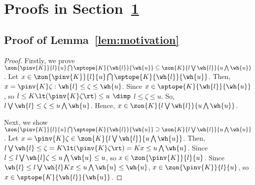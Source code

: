 
\section{Proofs in Section~\ref{}}
%
\subsection*{Proof of Lemma~\ref{lem:motivation}}
\begin{proof}
Firstly, we prove $\zon{\pinv{K}}{l}{u} \bigcap
\sptope{K}{\wh{l}}{\wh{u}} \subseteq \zon{K}{l\bigvee
  \wh{l}}{u\bigwedge \wh{u}}$.  Let $x\in\zon{\pinv{K}}{l}{u} \bigcap
\sptope{K}{\wh{l}}{\wh{u}}$.  Then, $x=\pinv{K}\zeta:
\wh{l}\leq\zeta\leq \wh{u}$.  Since $x\in\sptope{K}{\wh{l}}{\wh{u}}$, so
$l\leq K\lt(\pinv{K}\zeta\rt)\leq u$ $\dimp$ $l\leq \zeta\leq u$.  So,
$l\bigvee \wh{l}\leq \zeta\leq u\bigwedge\wh{u}$.  Hence, $x\in\zon{K}{l\bigvee
  \wh{l}}{u\bigwedge \wh{u}}$.

Next, we show $\zon{\pinv{K}}{l}{u} \bigcap \sptope{K}{\wh{l}}{\wh{u}}
\supseteq \zon{K}{l\bigvee \wh{l}}{u\bigwedge \wh{u}}$. Let
$x=\pinv{K}\zeta\in\zon{K}{l\bigvee \wh{l}}{u\bigwedge \wh{u}}$.
Then, $l\bigvee\wh{l}\leq \zeta = K\lt(\pinv{K}\zeta\rt)=Kx\leq
u\bigwedge\wh{u}$.  Since $l\leq l\bigvee\wh{l} \zeta\leq u\bigwedge
\wh{u}\leq u$, so $x\in \zon{\pinv{K}}{l}{u}$.  Since $\wh{l}\leq
l\bigvee\wh{l} Kx\leq u\bigwedge \wh{u}\leq \wh{u}$, $x\in
\zon{\pinv{K}}{l}{u}$, so $x\in\sptope{K}{\wh{l}}{\wh{u}}$.
\end{proof}
